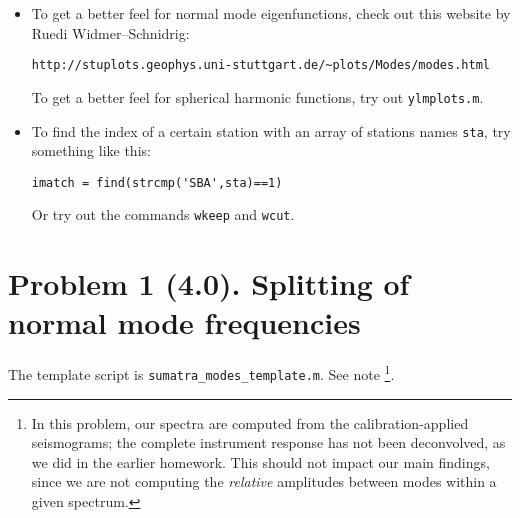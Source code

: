 \documentclass[11pt,titlepage,fleqn]{article}
\begin{document}
\begin{itemize}
\begin{itemize}
\end{itemize}


\item To get a better feel for normal mode eigenfunctions, check out this website by Ruedi Widmer--Schnidrig:
%
\begin{verbatim}
http://stuplots.geophys.uni-stuttgart.de/~plots/Modes/modes.html
\end{verbatim}
%
To get a better feel for spherical harmonic functions, try out \verb+ylmplots.m+.


\item To find the index of a certain station with an array of stations names \verb+sta+, try something like this:
%
\begin{verbatim}
imatch = find(strcmp('SBA',sta)==1)
\end{verbatim}
%
Or try out the commands \verb+wkeep+ and \verb+wcut+.

\end{itemize}


\section*{Problem 1 (4.0). Splitting of normal mode frequencies}

The template script is \verb+sumatra_modes_template.m+. See note \footnote{In this problem, our spectra are computed from the calibration-applied seismograms; the complete instrument response has not been deconvolved, as we did in the earlier homework. This should not impact our main findings, since we are not computing the {\em relative} amplitudes between modes within a given spectrum.}.
\end{document}
